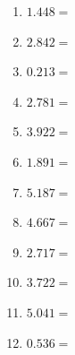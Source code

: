 \documentclass[12pt]{article}
\begin{document}
\begin{enumerate}
\item \large $ 1.448 = $ \vspace{1.5cm}
\item \large $ 2.842 = $ \vspace{1.5cm}
\newpage
\item \large $ 0.213 = $ \vspace{1.5cm}
\item \large $ 2.781 = $ \vspace{1.5cm}
\item \large $ 3.922 = $ \vspace{1.5cm}
\item \large $ 1.891 = $ \vspace{1.5cm}
\item \large $ 5.187 = $ \vspace{1.5cm}
\item \large $ 4.667 = $ \vspace{1.5cm}
\item \large $ 2.717 = $ \vspace{1.5cm}
\item \large $ 3.722 = $ \vspace{1.5cm}
\item \large $ 5.041 = $ \vspace{1.5cm}
\item \large $ 0.536 = $ \vspace{1.5cm}
\end{enumerate}\newpage
\end{document}
